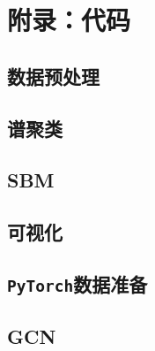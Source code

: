\section{附录：代码}

\subsection{数据预处理}





\subsection{谱聚类}

\subsection{SBM}


\subsection{可视化}


\subsection{\texttt{PyTorch}数据准备}

\subsection{GCN}
